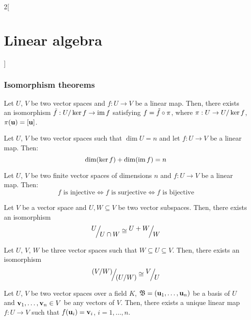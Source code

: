 \documentclass[../../../main.tex]{subfiles}
\begin{document}
\begin{multicols}{2}[\section{Linear algebra}]
    \subsubsection*{Isomorphism theorems}
    \begin{theorem}
        Let $U$, $V$ be two vector spaces and $f:U\rightarrow V$ be a linear map. Then, there exists an isomorphism $\Tilde{f}:\quot{U}{\ker f}\rightarrow \im f$ satisfying $f=\Tilde{f}\circ\pi$, where $\pi:U\rightarrow \quot{U}{\ker f}$, $\pi(\boldsymbol{\mathrm{u}})=[\boldsymbol{\mathrm{u}}]$.
        \begin{center}
            \begin{minipage}{\linewidth}
                \centering
                
            \end{minipage}
        \end{center}
    \end{theorem}
    \begin{corollary}
        Let $U$, $V$ be two vector spaces such that $\dim U=n$ and let $f:U\rightarrow V$ be a linear map. Then: $$\dim(\ker f)+\dim(\operatorname{im} f)=n$$
    \end{corollary}
    \begin{corollary}
        Let $U$, $V$ be two finite vector spaces of dimensions $n$ and $f:U\rightarrow V$ be a linear map. Then: $$f\text{ is injective}\iff f\text{ is surjective}\iff f\text{ is bijective}$$
    \end{corollary}
    \begin{theorem}
        Let $V$ be a vector space and $U,W\subseteq V$ be two vector subspaces. Then, there exists an isomorphism $$\quot{U}{U\cap W}\cong\quot{U+W}{W}$$
    \end{theorem}
    \begin{theorem}
        Let $U$, $V$, $W$ be three vector spaces such that $W\subseteq U\subseteq V$. Then, there exists an isomorphism $$\quot{{(\textstyle\quot{V}{W})}}{{(\textstyle\quot{U}{W})}}\cong\quot{V}{U}$$
    \end{theorem}
    \begin{theorem}
        Let $U$, $V$ be two vector spaces over a field $K$, $\mathfrak{B}=(\boldsymbol{\mathrm{u}}_1,\ldots,\boldsymbol{\mathrm{u}}_n)$ be a basis of $U$ and $\boldsymbol{\mathrm{v}}_1,\ldots,\boldsymbol{\mathrm{v}}_n\in V$ be any vectors of $V$. Then, there exists a unique linear map $f:U\rightarrow V$ such that $f(\boldsymbol{\mathrm{u}}_i)=\boldsymbol{\mathrm{v}}_i$, $i=1,\ldots,n$.
    \end{theorem}

\end{multicols}
\end{document}
